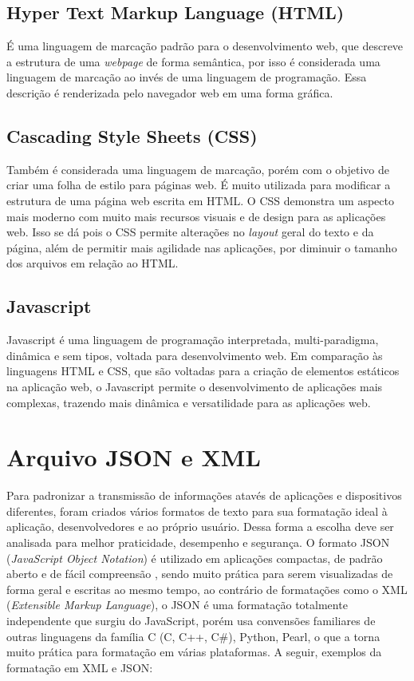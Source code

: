 \documentclass[../../layout.tex]{subfiles}
\begin{document}
\subsection{Hyper Text Markup Language (HTML)}
\hspace*{3em}É uma linguagem de marcação padrão para o desenvolvimento web, que descreve a estrutura de uma \emph{webpage} de forma semântica, por isso é considerada uma linguagem de marcação ao invés de uma linguagem de programação. Essa descrição é renderizada pelo navegador web em uma forma gráfica.\cite{frontend}

\subsection{Cascading Style Sheets (CSS)}
\hspace*{3em}Também é considerada uma linguagem de marcação, porém com o objetivo de criar uma folha de estilo para páginas web. É muito utilizada para modificar a estrutura de uma página web escrita em HTML. O CSS demonstra um aspecto mais moderno com muito mais recursos visuais e de design para as aplicações web. Isso se dá pois o CSS permite alterações no \emph{layout} geral do texto e da página, além de permitir mais agilidade nas aplicações, por diminuir o tamanho dos arquivos em relação ao HTML.\cite{frontend}

\subsection{Javascript}
\hspace*{3em}Javascript é uma linguagem de programação interpretada, multi-paradigma, dinâmica e sem tipos, voltada para desenvolvimento web. Em comparação às linguagens HTML e CSS, que são voltadas para a criação de elementos estáticos na aplicação web, o Javascript permite o desenvolvimento de aplicações mais complexas, trazendo mais dinâmica e versatilidade para as aplicações web.\cite{frontend}

\section{Arquivo JSON e XML}
\hspace*{3em}Para padronizar a transmissão de informações atavés de aplicações e dispositivos diferentes, foram criados vários formatos de texto para sua formatação ideal à aplicação, desenvolvedores e ao próprio usuário. Dessa forma a escolha deve ser analisada para melhor praticidade, desempenho e segurança. O formato JSON (\textit{JavaScript Object Notation}) é utilizado em aplicações compactas, de padrão aberto e de fácil compreensão , sendo muito prática para serem visualizadas de forma geral e escritas ao mesmo tempo, ao contrário de formatações como o XML (\textit{Extensible Markup Language}), o JSON é uma formatação totalmente independente que surgiu do JavaScript, porém usa convensões familiares de outras linguagens da família C (C, C++, C#), Python, Pearl, o que a torna muito prática para formatação em várias plataformas. A seguir, exemplos da formatação em XML e JSON:
\end{document}
